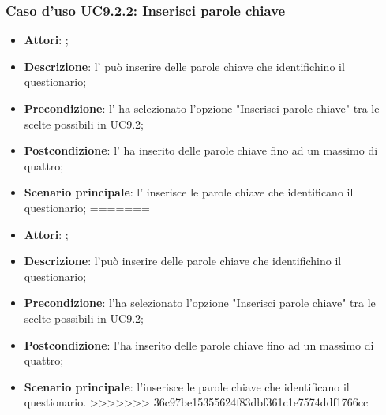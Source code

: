 		\subsubsection{Caso d'uso UC9.2.2: Inserisci parole chiave}
		\label{UC9.2.2}
		\begin{itemize}
<<<<<<< HEAD
			\item \textbf{Attori}: \uaupro{};
			\item \textbf{Descrizione}: l'\uaupro{} può inserire delle parole chiave che identifichino il questionario; 
			\item \textbf{Precondizione}: l'\uaupro{} ha selezionato l'opzione "Inserisci parole chiave" tra le scelte possibili in UC9.2;
			\item \textbf{Postcondizione}: l'\uaupro{} ha inserito delle parole chiave fino ad un massimo di quattro; 
			\item \textbf{Scenario principale}: l'\uaupro{} inserisce le parole chiave che identificano il questionario;
=======
			\item \textbf{Attori}: \uaupro;
			\item \textbf{Descrizione}: l'\uaupro può inserire delle parole chiave che identifichino il questionario; 
			\item \textbf{Precondizione}: l'\uaupro ha selezionato l'opzione "Inserisci parole chiave" tra le scelte possibili in UC9.2;
			\item \textbf{Postcondizione}: l'\uaupro ha inserito delle parole chiave fino ad un massimo di quattro; 
			\item \textbf{Scenario principale}: l'\uaupro inserisce le parole chiave che identificano il questionario.
>>>>>>> 36c97be15355624f83dbf361c1e7574ddf1766cc
		\end{itemize}
			
